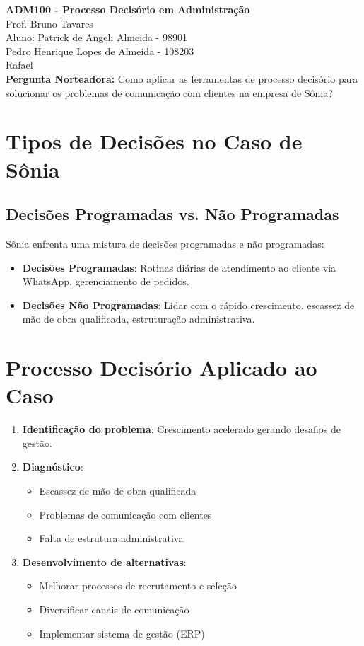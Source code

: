 \documentclass[11pt]{article}
\begin{document}
\begin{center}
    \textbf{ADM100 - Processo Decisório em Administração} \\
    Prof. Bruno Tavares \\
    Aluno: Patrick de Angeli Almeida - 98901 \\
    Pedro Henrique Lopes de Almeida - 108203 \\
    Rafael \\
    \vspace{1cm}
    \textbf{Pergunta Norteadora:} Como aplicar as ferramentas de processo decisório para solucionar os problemas de comunicação com clientes na empresa de Sônia?
\end{center}

\section{Tipos de Decisões no Caso de Sônia}

\subsection{Decisões Programadas vs. Não Programadas}

Sônia enfrenta uma mistura de decisões programadas e não programadas:

\begin{itemize}
    \item \textbf{Decisões Programadas}: Rotinas diárias de atendimento ao cliente via WhatsApp, gerenciamento de pedidos.
    \item \textbf{Decisões Não Programadas}: Lidar com o rápido crescimento, escassez de mão de obra qualificada, estruturação administrativa.
\end{itemize}

\section{Processo Decisório Aplicado ao Caso}

\begin{enumerate}
    \item \textbf{Identificação do problema}: Crescimento acelerado gerando desafios de gestão.
    \item \textbf{Diagnóstico}:
    \begin{itemize}
        \item Escassez de mão de obra qualificada
        \item Problemas de comunicação com clientes
        \item Falta de estrutura administrativa
    \end{itemize}
    \item \textbf{Desenvolvimento de alternativas}:
    \begin{itemize}
        \item Melhorar processos de recrutamento e seleção
        \item Diversificar canais de comunicação
        \item Implementar sistema de gestão (ERP)
    \end{itemize}
\end{enumerate}
\end{document}
